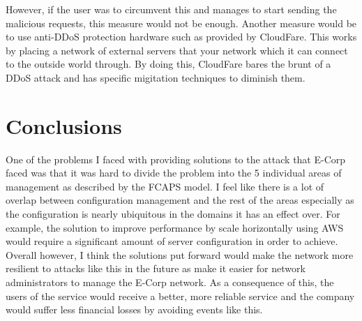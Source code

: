 \documentclass[]{report}
\begin{document}
However, if the user was to circumvent this and manages to start sending the malicious requests, this measure would not be enough. Another measure would be to use anti-DDoS protection hardware such as provided by CloudFare. This works by placing a network of external servers that your network which it can connect to the outside world through. By doing this, CloudFare bares the brunt of a DDoS attack and has specific migitation techniques to diminish them.

\section*{Conclusions}
One of the problems I faced with providing solutions to the attack that E-Corp faced was that it was hard to divide the problem into the 5 individual areas of management as described by the FCAPS model. I feel like there is a lot of overlap between configuration management and the rest of the areas especially as the configuration is nearly ubiquitous in the domains it has an effect over. For example, the solution to improve performance by scale horizontally using AWS would require a significant amount of server configuration in order to achieve. Overall however, I think the solutions put forward would make the network more resilient to attacks like this in the future as make it easier for network administrators to manage the E-Corp network. As a consequence of this, the users of the service would receive a better, more reliable service and the company would suffer less financial losses by avoiding events like this.
\end{document}

